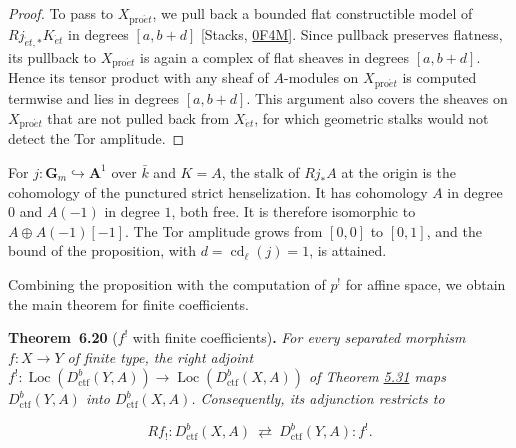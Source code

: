 \documentclass[11pt]{article}
\newenvironment{bpstatement}[2]{\par\addvspace{0.6\baselineskip}\noindent\textbf{#1}#2\textbf{.}\enspace\ignorespaces}
  {\par\addvspace{0.4\baselineskip}}
\newenvironment{bpstatementit}[2]{\begin{bpstatement}{#1}{#2}\itshape\ignorespaces}{\end{bpstatement}}
\providecommand{\Loc}{}\renewcommand{\Loc}{\operatorname{Loc}}
\begin{document}
\begin{proof}[{Proof}]
To pass to \(X_{\mathrm{pro}\acute{e}t}\), we pull back a bounded flat constructible model of \(Rj_{\acute{e}t,*}K_{\acute{e}t}\) in degrees \([a,b+d]\) [Stacks, \href{https://stacks.math.columbia.edu/tag/0F4M}{0F4M}]. Since pullback preserves flatness, its pullback to \(X_{\mathrm{pro}\acute{e}t}\) is again a complex of flat sheaves in degrees \([a,b+d]\). Hence its tensor product with any sheaf of \(A\)-modules on \(X_{\mathrm{pro}\acute{e}t}\) is computed termwise and lies in degrees \([a,b+d]\). This argument also covers the sheaves on \(X_{\mathrm{pro}\acute{e}t}\) that are not pulled back from \(X_{\acute{e}t}\), for which geometric stalks would not detect the Tor amplitude.
\end{proof}

\label{bp572}%
For \(j:\mathbf G_m\hookrightarrow\mathbf A^1\) over \(\bar k\) and \(K=A\), the stalk of \(Rj_*A\) at the origin is the cohomology of the punctured strict henselization. It has cohomology \(A\) in degree \(0\) and \(A(-1)\) in degree \(1\), both free. It is therefore isomorphic to \(A\oplus A(-1)[-1]\). The Tor amplitude grows from \([0,0]\) to \([0,1]\), and the bound of the proposition, with \(d=\operatorname{cd}_\ell(j)=1\), is attained.

Combining the proposition with the computation of \(p^!\) for affine space, we obtain the main theorem for finite coefficients.

\label{bp573}%
\begin{bpstatementit}{Theorem~6.20}{ ($f^!$ with finite coefficients)}
For every separated morphism \(f:X\to Y\) of finite type, the right adjoint \(f^!:\Loc(D^b_{\mathrm{ctf}}(Y,A))\to\Loc(D^b_{\mathrm{ctf}}(X,A))\) of Theorem \hyperref[bp506]{5.31} maps \(D^b_{\mathrm{ctf}}(Y,A)\) into \(D^b_{\mathrm{ctf}}(X,A)\). Consequently, its adjunction restricts to

\[
Rf_!:D^b_{\mathrm{ctf}}(X,A)\ \rightleftarrows\ D^b_{\mathrm{ctf}}(Y,A):f^!.
\]
\end{bpstatementit}
\end{document}
